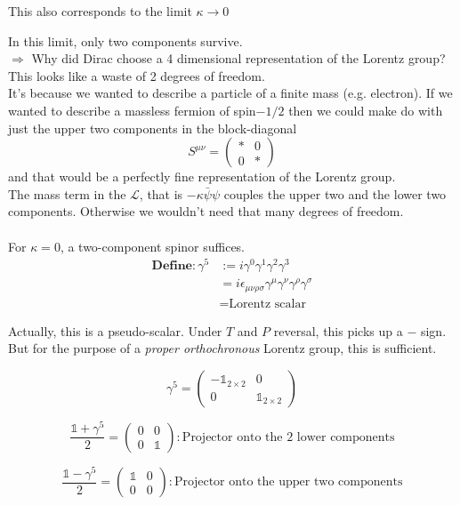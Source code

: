 \documentclass[11pt]{article}
\newcommand{\lag}{\mathcal{L}}
\begin{document}
			 
			 This also corresponds to the limit $\kappa \to 0$
			 
			 In this limit, only two components survive.\\
			 
			 
			 $\Rightarrow$ Why did Dirac choose a 4 dimensional representation of the Lorentz group? This looks like a waste of 2 degrees of freedom.\\
			 
			 It's because we wanted to describe a particle of a finite mass (e.g. electron). If we wanted to describe a massless fermion of spin$-1/2$ then
			 we could make do with just the upper two components in the block-diagonal $$S^{\mu\nu} = \begin{pmatrix}
			 	* & 0 \\ 0 & *
			 \end{pmatrix}$$
			 and that would be a perfectly fine representation of the Lorentz group.\\
	
	
		The mass term in the $\lag$, that is $-\kappa\bar{\psi}\psi$ couples the upper two and the lower two components.
			Otherwise we wouldn't need that many degrees of freedom.\\
	
	
			\\
			
			
				For $\kappa = 0$, a two-component spinor suffices.\\
				
			
			
			\begin{align*}
			\textbf{Define}:	\gamma^5 &:= i\gamma^0 \gamma^1 \gamma^2 \gamma^3\\
						& = i \epsilon_{\mu\nu\rho\sigma} \gamma^\mu \gamma^\nu \gamma^\rho \gamma^\sigma \\
						& = \text{Lorentz scalar}
			\end{align*}
			 
			 Actually, this is a pseudo-scalar. Under $T$ and $P$ reversal, this picks up a $-$ sign. But for the purpose of a \textit{proper orthochronous} Lorentz group, this is sufficient.
			 
			 \[ \gamma^5 = \begin{pmatrix}
			 	-\mathbb{1}_{2\times 2} & 0 \\
			 	0 & \mathbb{1}_{2\times 2}
			 \end{pmatrix}\]
			 
			 
			 \[ \frac{\mathbb{1} + \gamma^5}{2} = \begin{pmatrix}
			 	0 & 0 \\ 0 & \mathbb{1}
			 \end{pmatrix} : \text{Projector onto the 2 lower components}\]
		 
		 	\[ \frac{\mathbb{1} - \gamma^5}{2}  = \begin{pmatrix}
		 		\mathbb{1} & 0 \\ 0 & 0
		 	\end{pmatrix} : \text{Projector onto the upper two components}\]
			 
			 
	
\end{document}
